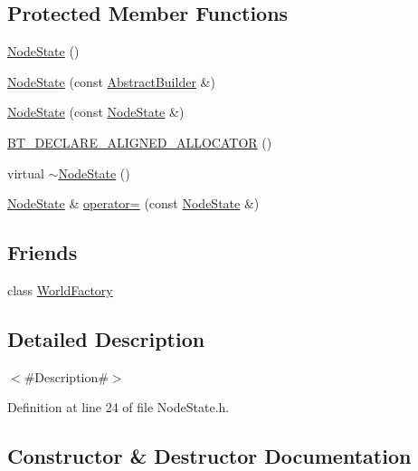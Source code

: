 \subsection*{Protected Member Functions}
\begin{DoxyCompactItemize}
\item 
\mbox{\hyperlink{classnjli_1_1_node_state_a1ad92560b4057809dcf0a658d576cd6a}{Node\+State}} ()
\item 
\mbox{\hyperlink{classnjli_1_1_node_state_a1cd1d39f5b5e14e5466d4bcb75adc568}{Node\+State}} (const \mbox{\hyperlink{classnjli_1_1_abstract_builder}{Abstract\+Builder}} \&)
\item 
\mbox{\hyperlink{classnjli_1_1_node_state_a102adf95d05a404dc6b564ea7a18c723}{Node\+State}} (const \mbox{\hyperlink{classnjli_1_1_node_state}{Node\+State}} \&)
\item 
\mbox{\hyperlink{classnjli_1_1_node_state_a30ad1be81dbbe9614a951859c319447b}{B\+T\+\_\+\+D\+E\+C\+L\+A\+R\+E\+\_\+\+A\+L\+I\+G\+N\+E\+D\+\_\+\+A\+L\+L\+O\+C\+A\+T\+OR}} ()
\item 
virtual \mbox{\hyperlink{classnjli_1_1_node_state_ae336cf62e8e11ed6016fd1737a4604a9}{$\sim$\+Node\+State}} ()
\item 
\mbox{\hyperlink{classnjli_1_1_node_state}{Node\+State}} \& \mbox{\hyperlink{classnjli_1_1_node_state_a680aec8f08f28157238c1f2d178e99b3}{operator=}} (const \mbox{\hyperlink{classnjli_1_1_node_state}{Node\+State}} \&)
\end{DoxyCompactItemize}
\subsection*{Friends}
\begin{DoxyCompactItemize}
\item 
class \mbox{\hyperlink{classnjli_1_1_node_state_acb96ebb09abe8f2a37a915a842babfac}{World\+Factory}}
\end{DoxyCompactItemize}


\subsection{Detailed Description}
$<$\#\+Description\#$>$ 

Definition at line 24 of file Node\+State.\+h.



\subsection{Constructor \& Destructor Documentation}
\mbox{\label{classnjli_1_1_node_state_a1ad92560b4057809dcf0a658d576cd6a}} 
